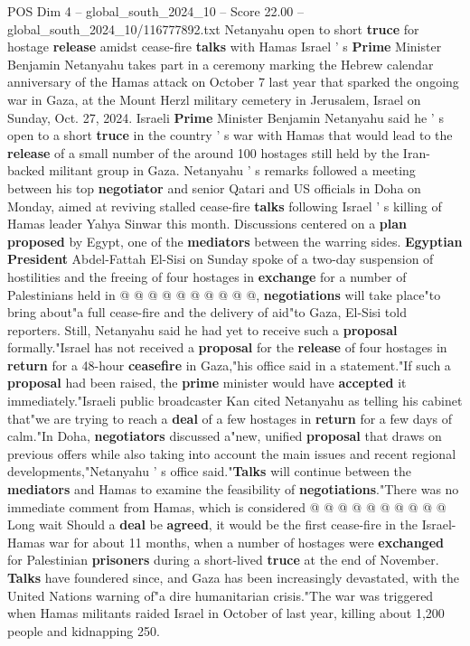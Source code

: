 \begin{textsample}{POS Dim 4 – global\_south\_2024\_10 – Score 22.00 – global\_south\_2024\_10/116777892.txt}  \label{ex:f4_pos_391}
Netanyahu open to short \textbf{truce} for hostage \textbf{release} amidst cease-fire \textbf{talks} with Hamas Israel ' s \textbf{Prime} Minister Benjamin Netanyahu takes part in a ceremony marking the Hebrew calendar anniversary of the Hamas attack on October 7 last year that sparked the ongoing war in Gaza, at the Mount Herzl military cemetery in Jerusalem, Israel on Sunday, Oct. 27, 2024.
Israeli \textbf{Prime} Minister Benjamin Netanyahu said he ' s open to a short \textbf{truce} in the country ' s war with Hamas that would lead to the \textbf{release} of a small number of the around 100 hostages still held by the Iran-backed militant group in Gaza.
Netanyahu ' s remarks followed a meeting between his top \textbf{negotiator} and senior Qatari and US officials in Doha on Monday, aimed at reviving stalled cease-fire \textbf{talks} following Israel ' s killing of Hamas leader Yahya Sinwar this month.
Discussions centered on a \textbf{plan} \textbf{proposed} by Egypt, one of the \textbf{mediators} between the warring sides. \textbf{Egyptian} \textbf{President} Abdel-Fattah El-Sisi on Sunday spoke of a two-day suspension of hostilities and the freeing of four hostages in \textbf{exchange} for a number of Palestinians held in @ @ @ @ @ @ @ @ @ @, \textbf{negotiations} will take place"to bring about"a full cease-fire and the delivery of aid"to Gaza, El-Sisi told reporters.
Still, Netanyahu said he had yet to receive such a \textbf{proposal} formally."Israel has not received a \textbf{proposal} for the \textbf{release} of four hostages in \textbf{return} for a 48-hour \textbf{ceasefire} in Gaza,"his office said in a statement."If such a \textbf{proposal} had been raised, the \textbf{prime} minister would have \textbf{accepted} it immediately."Israeli public broadcaster Kan cited Netanyahu as telling his cabinet that"we are trying to reach a \textbf{deal} of a few hostages in \textbf{return} for a few days of calm."In Doha, \textbf{negotiators} discussed a"new, unified \textbf{proposal} that draws on previous offers while also taking into account the main issues and recent regional developments,"Netanyahu ' s office said."\textbf{Talks} will continue between the \textbf{mediators} and Hamas to examine the feasibility of \textbf{negotiations}."There was no immediate comment from Hamas, which is considered @ @ @ @ @ @ @ @ @ @ Long wait Should a \textbf{deal} be \textbf{agreed}, it would be the first cease-fire in the Israel-Hamas war for about 11 months, when a number of hostages were \textbf{exchanged} for Palestinian \textbf{prisoners} during a short-lived \textbf{truce} at the end of November. \textbf{Talks} have foundered since, and Gaza has been increasingly devastated, with the United Nations warning of"a dire humanitarian crisis."The war was triggered when Hamas militants raided Israel in October of last year, killing about 1,200 people and kidnapping 250.

\end{textsample}
